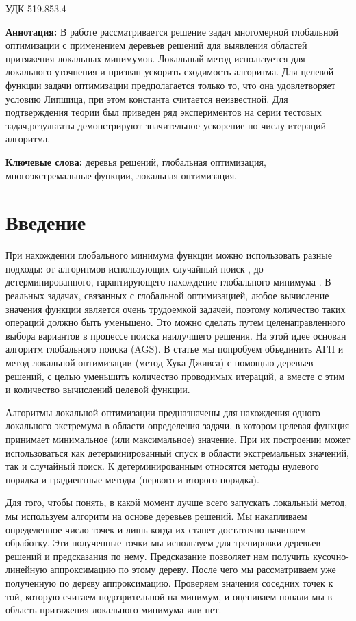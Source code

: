 \documentclass[12pt, a4paper, russian]{article}
\begin{document}
УДК 519.853.4

\vspace{\baselineskip}

\begin{small}
\textbf{Аннотация:} В работе рассматривается решение задач многомерной глобальной оптимизации с применением деревьев решений для выявления областей притяжения локальных минимумов. Локальный метод используется для локального уточнения и призван ускорить сходимость алгоритма. Для целевой функции задачи оптимизации предполагается только то, что она удовлетворяет условию Липшица, при этом константа считается неизвестной. Для подтверждения теории был приведен ряд экспериментов на серии тестовых задач,результаты демонстрируют значительное ускорение по числу итераций алгоритма.

\textbf{Ключевые слова:} деревья решений, глобальная оптимизация, многоэкстремальные функции, локальная оптимизация.
\end{small}


\section{Введение}

При нахождении глобального минимума функции можно использовать разные подходы: от алгоритмов использующих случайный поиск \cite{fio_bib1, fio_bib2, fio_bib3}, до детерминированного, гарантирующего нахождение глобального минимума \cite{. fio_bib4, fio_bib5, fio_bib6}. В реальных задачах, связанных с глобальной оптимизацией, любое вычисление значения функции является очень трудоемкой задачей, поэтому количество таких операций должно быть уменьшено. Это можно сделать путем целенаправленного выбора вариантов в процессе поиска наилучшего решения. На этой идее основан алгоритм глобального поиска (AGS). В статье мы попробуем объединить АГП и метод локальной оптимизации (метод Хука-Дживса) с помощью деревьев решений, с целью уменьшить количество проводимых итераций, а вместе с этим и количество вычислений целевой функции.

Алгоритмы локальной оптимизации предназначены для нахождения одного локального экстремума в области определения задачи, в котором целевая функция принимает  минимальное (или максимальное) значение. При их построении может использоваться как детерминированный спуск в области экстремальных значений, так и случайный поиск. К детерминированным относятся методы нулевого порядка и градиентные методы (первого и второго порядка).

Для того, чтобы понять, в какой момент лучше всего запускать локальный метод, мы используем алгоритм на основе деревьев решений. Мы накапливаем определенное число точек и лишь когда их станет достаточно начинаем обработку. Эти полученные точки мы используем для тренировки деревьев решений и предсказания по нему. Предсказание позволяет нам получить кусочно-линейную аппроксимацию по этому дереву. После чего мы рассматриваем уже полученную по дереву аппроксимацию. Проверяем значения соседних точек к той, которую считаем подозрительной на минимум, и оцениваем попали мы в область притяжения локального минимума или нет. 
\end{document}
